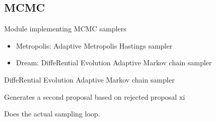 \documentclass[a4paper,10pt,english]{sphinxmanual}
\begin{document}
\subsection{MCMC}
\label{BIP.Bayes.Samplers:mcmc}\label{BIP.Bayes.Samplers:module-BIP.Bayes.Samplers.MCMC}
Module implementing MCMC samplers
\begin{itemize}
\item {} 
Metropolis: Adaptive Metropolis Hastings sampler

\item {} 
Dream: DiffeRential Evolution Adaptive Markov chain sampler

\end{itemize}

\begin{fulllineitems}
\label{BIP.Bayes.Samplers:BIP.Bayes.Samplers.MCMC.Dream}
DiffeRential Evolution Adaptive Markov chain sampler

\begin{fulllineitems}
\label{BIP.Bayes.Samplers:BIP.Bayes.Samplers.MCMC.Dream.delayed_rejection}
Generates a second proposal based on rejected proposal xi

\end{fulllineitems}


\begin{fulllineitems}
\label{BIP.Bayes.Samplers:BIP.Bayes.Samplers.MCMC.Dream.step}
Does the actual sampling loop.

\end{fulllineitems}


\end{fulllineitems}

\end{document}

